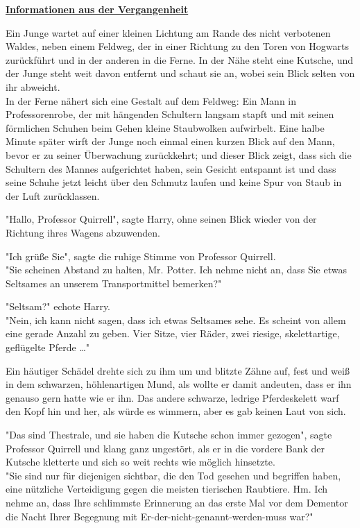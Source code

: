 

\hypertarget{informationen-aus-der-vergangenheit}{%

\textbf{\uline{Informationen aus der Vergangenheit}}

Ein Junge wartet auf einer kleinen Lichtung am Rande des nicht verbotenen Waldes, neben einem Feldweg, der in einer Richtung zu den Toren von Hogwarts zurückführt und in der anderen in die Ferne. In der Nähe steht eine Kutsche, und der Junge steht weit davon entfernt und schaut sie an, wobei sein Blick selten von ihr abweicht.\\ In der Ferne nähert sich eine Gestalt auf dem Feldweg: Ein Mann in Professorenrobe, der mit hängenden Schultern langsam stapft und mit seinen förmlichen Schuhen beim Gehen kleine Staubwolken aufwirbelt. Eine halbe Minute später wirft der Junge noch einmal einen kurzen Blick auf den Mann, bevor er zu seiner Überwachung zurückkehrt; und dieser Blick zeigt, dass sich die Schultern des Mannes aufgerichtet haben, sein Gesicht entspannt ist und dass seine Schuhe jetzt leicht über den Schmutz laufen und keine Spur von Staub in der Luft zurücklassen.

"Hallo, Professor Quirrell", sagte Harry, ohne seinen Blick wieder von der Richtung ihres Wagens abzuwenden.

"Ich grüße Sie", sagte die ruhige Stimme von Professor Quirrell.\\ "Sie scheinen Abstand zu halten, Mr. Potter. Ich nehme nicht an, dass Sie etwas Seltsames an unserem Transportmittel bemerken?"

"Seltsam?" echote Harry.\\ "Nein, ich kann nicht sagen, dass ich etwas Seltsames sehe. Es scheint von allem eine gerade Anzahl zu geben. Vier Sitze, vier Räder, zwei riesige, skelettartige, geflügelte Pferde …"

Ein häutiger Schädel drehte sich zu ihm um und blitzte Zähne auf, fest und weiß in dem schwarzen, höhlenartigen Mund, als wollte er damit andeuten, dass er ihn genauso gern hatte wie er ihn. Das andere schwarze, ledrige Pferdeskelett warf den Kopf hin und her, als würde es wimmern, aber es gab keinen Laut von sich.

"Das sind Thestrale, und sie haben die Kutsche schon immer gezogen", sagte Professor Quirrell und klang ganz ungestört, als er in die vordere Bank der Kutsche kletterte und sich so weit rechts wie möglich hinsetzte.\\ "Sie sind nur für diejenigen sichtbar, die den Tod gesehen und begriffen haben, eine nützliche Verteidigung gegen die meisten tierischen Raubtiere. Hm. Ich nehme an, dass Ihre schlimmste Erinnerung an das erste Mal vor dem Dementor die Nacht Ihrer Begegnung mit Er-der-nicht-genannt-werden-muss war?"

}
